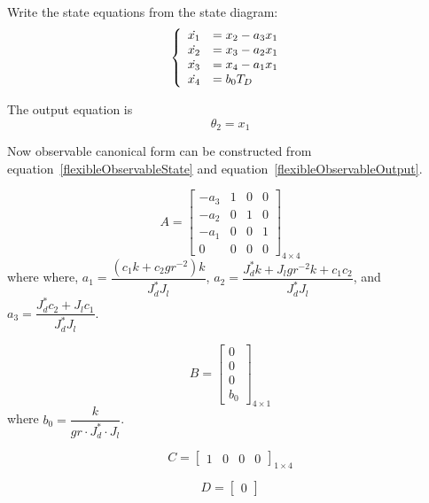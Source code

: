 \documentclass[a4paper, 12pt]{article}
\begin{document}
Write the state equations from the state diagram:
\begin{equation}\label{flexibleObservableState}
\left\{ \begin{array}{l l} 
\dot{x_1} &= x_2 - a_3 x_1\\
\dot{x_2} &= x_3 - a_2 x_1\\
\dot{x_3} &= x_4 - a_1 x_1\\
\dot{x_4} &= b_0 T_D
\end{array}\right.\ 
\end{equation}

The output equation is 
\begin{equation}\label{flexibleObservableOutput}
\theta_2 = x_1
\end{equation}

Now observable canonical form can be constructed from equation~\ref{flexibleObservableState} and equation~\ref{flexibleObservableOutput}. 


\begin{equation}\label{flexibleObservableA}
A = \begin{bmatrix}
-a_3	&	1	&	0	&	0	\\
-a_2	&	0	&	1	&	0	\\
-a_1	&	0	&	0	&	1	\\
0	&	0	&	0	&	0
\end{bmatrix}_{4\times 4}
\end{equation}
where where, $a_1 = \dfrac{(c_1 k +c_2 gr^{-2})k}{J_d^* J_l} $, $a_2 = \dfrac{J_d^* k + J_l gr^{-2} k + c_1 c_2}{J_d^* J_l}$, and $a_3 = \dfrac{J_d^*c_2 + J_l c_1}{J_d^*J_l}$.


\begin{equation}\label{flexibleObservableB}
B = \begin{bmatrix}
0	\\
0	\\
0	\\
b_0
\end{bmatrix}_{4\times 1}
\end{equation}
where $b_0 = \dfrac{k}{gr\cdot J_d^* \cdot J_l}$.


\begin{equation}\label{flexibleControllableC}
C = \begin{bmatrix}
1	&	0	&	0	&	0
\end{bmatrix}_{1\times 4}
\end{equation}

\begin{equation}
D = \begin{bmatrix} 0 \end{bmatrix}
\end{equation}
\end{document}
